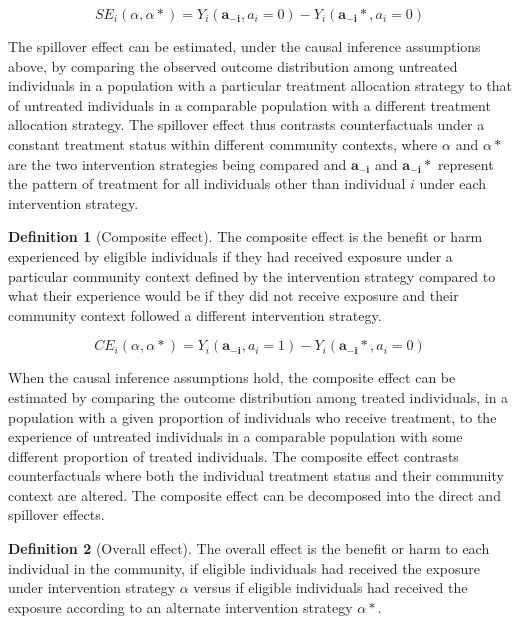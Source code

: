 \documentclass{article}
\theoremstyle{definition}
\newtheorem{definition}{Definition}[section]
\begin{document}
\begin{equation}\label{eq:2}
   SE_{i}\left(\alpha,\alpha*\right) = Y_{i}\left(\mathbf{a_{-i}}, a_{i} = 0\right) - Y_{i}\left(\mathbf{a_{-i}*}, a_{i} = 0\right)	
\end{equation}

The spillover effect can be estimated, under the causal inference assumptions above, by comparing the observed outcome distribution among untreated individuals in a population with a particular treatment allocation strategy to that of untreated individuals in a comparable population with a different treatment allocation strategy. The spillover effect thus contrasts counterfactuals under a constant treatment status within different community contexts, where $\alpha$ and $\alpha*$ are the two intervention strategies being compared and $\mathbf{a_{-i}}$ and $\mathbf{a_{-i}}*$ represent the pattern of treatment for all individuals other than individual $i$ under each intervention strategy.

	
\begin{definition}[Composite effect]The composite effect is the benefit or harm experienced by eligible individuals if they had received exposure under a particular community context defined by the intervention strategy compared to what their experience would be if they did not receive exposure and their community context followed a different intervention strategy.
\end{definition}

\begin{equation}\label{eq:3}
   CE_{i}\left(\alpha,\alpha*\right) = Y_{i}\left(\mathbf{a_{-i}}, a_{i} = 1\right) - Y_{i}\left(\mathbf{a_{-i}*}, a_{i} = 0\right)	
\end{equation}

When the causal inference assumptions hold, the composite effect can be estimated by comparing the outcome distribution among treated individuals, in a population with a given proportion of individuals who receive treatment, to the experience of untreated individuals in a comparable population with some different proportion of treated individuals. The composite effect contrasts counterfactuals where both the individual treatment status and their community context are altered. The composite effect can be decomposed into the direct and spillover effects.

\begin{definition}[Overall effect] The overall effect is the benefit or harm to each individual in the community, if  eligible individuals had received the exposure under intervention strategy $\alpha$ versus if eligible individuals had received the exposure according to an alternate intervention strategy $\alpha*$.
\end{definition}
\end{document}
